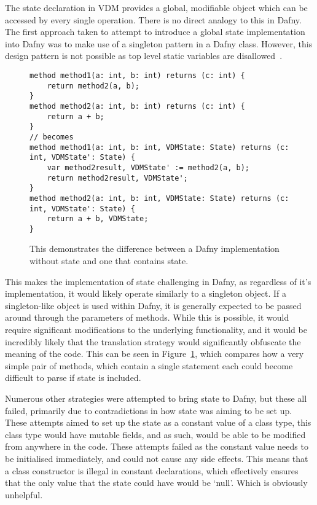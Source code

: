 \documentclass{entcs}
\begin{document}
The state declaration in VDM provides a global, modifiable object which can be accessed by every single operation. There is no direct analogy to this in Dafny. The first approach taken to attempt to introduce a global state implementation into Dafny was to make use of a singleton pattern in a Dafny class. However, this design pattern is not possible as top level static variables are disallowed~\cite{DafnyStaticVariables}.

\begin{figure}[h]
	\begin{center}
        \begin{lstlisting}[language=Dafny]
method method1(a: int, b: int) returns (c: int) {
    return method2(a, b);
}
method method2(a: int, b: int) returns (c: int) {
    return a + b;
}
// becomes
method method1(a: int, b: int, VDMState: State) returns (c: int, VDMState': State) {
    var method2result, VDMState' := method2(a, b);
    return method2result, VDMState';
}
method method2(a: int, b: int, VDMState: State) returns (c: int, VDMState': State) {
    return a + b, VDMState;
}

        \end{lstlisting}
		\caption{This demonstrates the difference between a Dafny implementation without state and one that contains state.}\label{fig:vdm_state_in_dafny}
	\end{center}
\end{figure}

This makes the implementation of state challenging in Dafny, as regardless of it's implementation, it would likely operate similarly to a singleton object. If a singleton-like object is used within Dafny, it is generally expected to be passed around through the parameters of methods. While this is possible, it would require significant modifications to the underlying functionality, and it would be incredibly likely that the translation strategy would significantly obfuscate the meaning of the code. This can be seen in Figure~\ref{fig:vdm_state_in_dafny}, which compares how a very simple pair of methods, which contain a single statement each could become difficult to parse if state is included.

Numerous other strategies were attempted to bring state to Dafny, but these all failed, primarily due to contradictions in how state was aiming to be set up. These attempts aimed to set up the state as a constant value of a class type, this class type would have mutable fields, and as such, would be able to be modified from anywhere in the code. These attempts failed as the constant value needs to be initialised immediately, and could not cause any side effects. This means that a class constructor is illegal in constant declarations, which effectively ensures that the only value that the state could have would be `null'. Which is obviously unhelpful.
\end{document}
